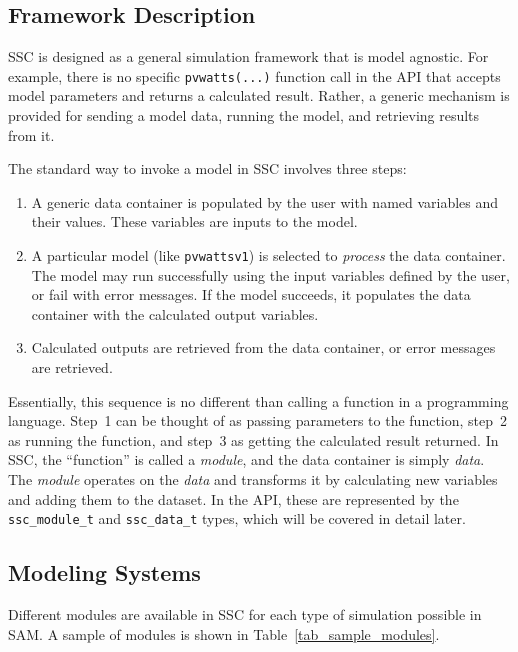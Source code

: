 \documentclass{article}
\begin{document}
\subsection{Framework Description}

SSC is designed as a general simulation framework that is model agnostic.  For example, there is no specific \texttt{pvwatts(...)} function call in the API that accepts model parameters and returns a calculated result.  Rather, a generic mechanism is provided for sending a model data, running the model, and retrieving results from it.  

The standard way to invoke a model in SSC involves three steps:

\begin{enumerate}
\item A generic data container is populated by the user with named variables and their values.  These variables are inputs to the model.
\item A particular model (like \texttt{pvwattsv1}) is selected to \emph{process} the data container.  The model may run successfully using the input variables defined by the user, or fail with error messages.  If the model succeeds, it populates the data container with the calculated output variables.
\item Calculated outputs are retrieved from the data container, or error messages are retrieved.
\end{enumerate}

Essentially, this sequence is no different than calling a function in a programming language.  Step~1 can be thought of as passing parameters to the function, step~2 as running the function, and step~3 as getting the calculated result returned.  In SSC, the ``function'' is called a \emph{module}, and the data container is simply \emph{data}.  The \emph{module} operates on the \emph{data} and transforms it by calculating new variables and adding them to the dataset.  In the API, these are represented by the \texttt{ssc\_module\_t} and \texttt{ssc\_data\_t} types, which will be covered in detail later.

\subsection{Modeling Systems}
\label{sec_modeling_systems}
Different modules are available in SSC for each type of simulation possible in SAM.  A sample of modules is shown in Table~\ref{tab_sample_modules}.
\end{document}
